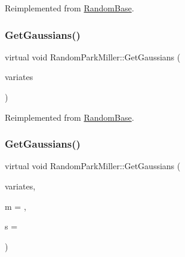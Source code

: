 Reimplemented from \hyperlink{classRandomBase_a5b5c89afe295ba49a5474cdc3bf80c3d}{Random\+Base}.

\hypertarget{classRandomParkMiller_a7c7f7c1079bdf8462af5bcce3787ae03}{}\label{classRandomParkMiller_a7c7f7c1079bdf8462af5bcce3787ae03} 
\subsubsection{\texorpdfstring{Get\+Gaussians()}{GetGaussians()}\hspace{0.1cm}{\footnotesize\ttfamily [1/2]}}
{\footnotesize\ttfamily virtual void Random\+Park\+Miller\+::\+Get\+Gaussians (\begin{DoxyParamCaption}\item[{\hyperlink{classMJArray}{M\+J\+Array} \&}]{variates }\end{DoxyParamCaption})\hspace{0.3cm}{\ttfamily [virtual]}}



Reimplemented from \hyperlink{classRandomBase_aac297a1b64959492831f5e9a1f28c03d}{Random\+Base}.

\hypertarget{classRandomParkMiller_adbc2537add4042bb4d0bb162f8d2b998}{}\label{classRandomParkMiller_adbc2537add4042bb4d0bb162f8d2b998} 
\subsubsection{\texorpdfstring{Get\+Gaussians()}{GetGaussians()}\hspace{0.1cm}{\footnotesize\ttfamily [2/2]}}
{\footnotesize\ttfamily virtual void Random\+Park\+Miller\+::\+Get\+Gaussians (\begin{DoxyParamCaption}\item[{vector$<$ double $>$ \&}]{variates,  }\item[{double}]{m = {},  }\item[{double}]{s = {} }\end{DoxyParamCaption})\hspace{0.3cm}{\ttfamily [virtual]}}

\hypertarget{classRandomParkMiller_ac9ecb9d60e18a611f4e4458cae09998c}{}\label{classRandomParkMiller_ac9ecb9d60e18a611f4e4458cae09998c} 
